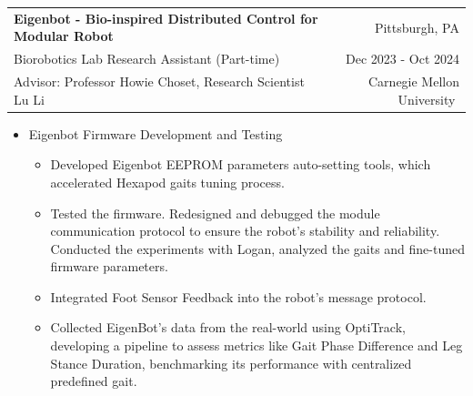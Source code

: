 \documentclass[a4paper,20pt]{article}
\makeatletter
\newcommand{\resumeResearchSubheading}[7]{
  \vspace{5pt}\item
    \begin{tabular*} {0.98\textwidth} {@{\hspace{-0.5em}}l@{\extracolsep{\fill}}r@{}}
      \textbf{#1} & {#2}\null \\
      {#3} & {#4} \\
      {#5} & {#6} \vspace*{4pt}
      {#7}
    \end{tabular*}
  \vspace{-6pt}
}
\newcommand{\resumeResearchItemListStart}{
  \begin{itemize} [leftmargin=*]
}
\newcommand{\resumeResearchItemListEnd}{
  \end{itemize}
  \vspace{-5pt}
}
\newcommand{\resumeResearchItem}[1]{
  \item{
    {#1 \vspace{-1pt}}
  }
}
\newcommand{\resumeResearchMidItemListStart}{
  \begin{itemize} [leftmargin=*]
}
\newcommand{\resumeResearchMidItemListEnd}{
  \end{itemize}
  \vspace{-5pt}
}
\newcommand{\resumeResearchMidItem}[2]{
  \item{
    \textbf{#1}
    {#2 \vspace{-2pt}}
  }
}
\makeatother
\begin{document}
\resumeResearchSubheading
{Eigenbot - Bio-inspired Distributed Control for Modular Robot} {Pittsburgh, PA}
{Biorobotics Lab Research Assistant (Part-time)} {Dec 2023 - Oct 2024}
{Advisor: Professor Howie Choset, Research Scientist Lu Li} {Carnegie Mellon University}
\resumeResearchMidItemListStart
\vspace{-3pt}
\resumeResearchMidItem{}
{Eigenbot Firmware Development and Testing}
{
  \resumeResearchItemListStart
  \resumeResearchItem{}
  {Developed Eigenbot EEPROM parameters auto-setting tools, which accelerated Hexapod gaits tuning process.}
  \resumeResearchItem{}
  {Tested the firmware. Redesigned and debugged the module communication protocol to ensure the robot's stability and reliability. Conducted the experiments with Logan, analyzed the gaits and fine-tuned firmware parameters.}
  \resumeResearchItem{}
  {Integrated Foot Sensor Feedback into the robot's message protocol.}
  \resumeResearchItem{}
  {Collected EigenBot's data from the real-world using OptiTrack, developing a pipeline to assess metrics like Gait Phase Difference and Leg Stance Duration, benchmarking its performance with centralized predefined gait.}
  \resumeResearchItemListEnd
}
\resumeResearchMidItemListEnd
\end{document}
